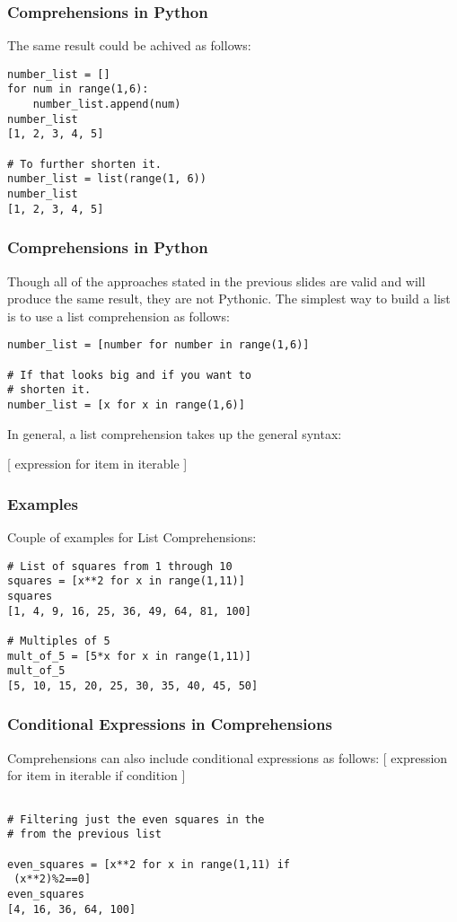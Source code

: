 \documentclass{beamer}
\begin{document}
\begin{frame}[fragile]
\frametitle{Comprehensions in Python}
The same result could be achived as follows:
\begin{lstlisting}
number_list = []
for num in range(1,6):
    number_list.append(num)
number_list
[1, 2, 3, 4, 5]

# To further shorten it.
number_list = list(range(1, 6))
number_list
[1, 2, 3, 4, 5]
\end{lstlisting}
\end{frame}

\begin{frame}[fragile]
\frametitle{Comprehensions in Python}
Though all of the approaches stated in the previous slides are valid and will produce the same result, they are not Pythonic. The simplest way to build a list is to use a list comprehension as follows:
\begin{lstlisting}
number_list = [number for number in range(1,6)]

# If that looks big and if you want to 
# shorten it.
number_list = [x for x in range(1,6)]

\end{lstlisting}

In general, a list comprehension takes up the general syntax:

[ expression for item in iterable ]
\end{frame}

\begin{frame}[fragile]
\frametitle{Examples}
Couple of examples for List Comprehensions:
\begin{lstlisting}
# List of squares from 1 through 10
squares = [x**2 for x in range(1,11)]
squares
[1, 4, 9, 16, 25, 36, 49, 64, 81, 100]

# Multiples of 5
mult_of_5 = [5*x for x in range(1,11)]
mult_of_5
[5, 10, 15, 20, 25, 30, 35, 40, 45, 50]
\end{lstlisting}

\end{frame}

\begin{frame}[fragile]
\frametitle{Conditional Expressions in Comprehensions}
Comprehensions can also include conditional expressions as follows:
[ expression for item in iterable if condition ]
\begin{lstlisting}

# Filtering just the even squares in the 
# from the previous list

even_squares = [x**2 for x in range(1,11) if
 (x**2)%2==0]
even_squares
[4, 16, 36, 64, 100]

\end{lstlisting}

\end{frame}
\end{document}
